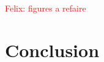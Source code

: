 \documentclass[final,3p,times,twocolumn]{elsarticle}
\newcommand{\fg}[1]{\textcolor{red}{ Felix: #1}}
\begin{document}
\fg{figures a refaire}
\section{Conclusion}

\clearpage



\end{document}
